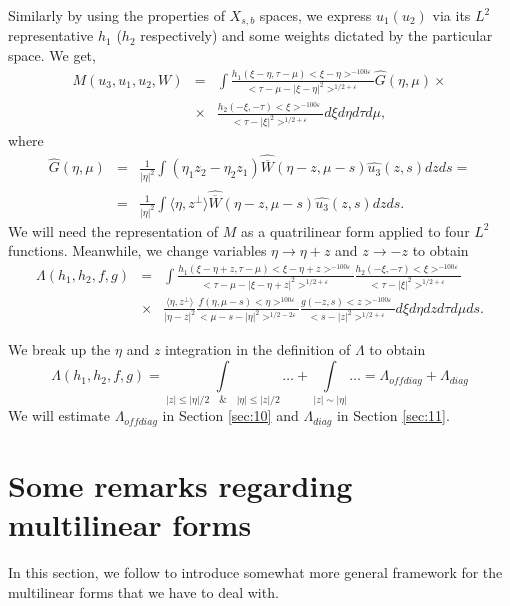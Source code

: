 \documentclass[draft,11pt,leqno]{amsart}
\newcommand{\q}{\quad}
\newcommand{\ve}{\varepsilon}
\newcommand{\La}{\Lambda}
\newcommand{\intl}{\int\limits}
\newcommand{\f}{\displaystyle\frac}
\newcommand{\dpr}[2]{\langle #1, #2\rangle}
\newcommand{\ov}{\overline}
\begin{document}
Similarly by  using  the properties of $X_{s,b}$ spaces, we express
$u_1(u_2)$ via its $L^2$ representative $h_1$ ($h_2$ respectively)
 and some weights dictated by the
particular space. We get,
\begin{eqnarray}
\label{eq:8}
M(u_3,u_1,u_2,W) &=& \int
\f{h_1(\xi-\eta,\tau-\mu)<\xi-\eta>^{-100\ve}}{<\tau-\mu-|\xi-\eta|^2>^{1/2+\ve}}
\widehat{G}(\eta,\mu) \times\\
&\times &\f{h_2(-\xi,-\tau)<\xi>^{-100\ve}}{<\tau-|\xi|^2>^{1/2+\ve}}
d\xi d\eta d\tau d\mu,
\nonumber
\end{eqnarray}
where
\begin{eqnarray}
\label{eq:9}
 \widehat{G}(\eta,\mu)  &=& \f{1}{|\eta|^2} \int (\eta_1 z_2-\eta_2 z_1)
\widehat{\ov{W}}(\eta-z,\mu-s)
\widehat{u_3}(z,s)dz ds=\\
&=& \f{1}{|\eta|^2} \int \dpr{\eta}{z^{\bot}}
\widehat{\ov{W}}(\eta-z,\mu-s)
\widehat{u_3}(z,s)dz ds.
\nonumber
\end{eqnarray}
We will need the representation
of $M$ as a quatrilinear form applied to four $L^2$ functions. Meanwhile, we
change variables $\eta\to\eta+z$ and $z\to -z$ to  obtain
\begin{eqnarray}
\label{eq:100}
\La(h_1,h_2,f,g) &=& \int
\f{h_1(\xi-\eta+z,\tau-\mu)<\xi-\eta+z>^{-100\ve}}{<\tau-\mu-|\xi-\eta+z|^2>^
{1/2+\ve}} \f{h_2(-\xi,-\tau)<\xi>^{-100\ve}}{<\tau-|\xi|^2>^{1/2+\ve}} \\
&\times & \f{\dpr{\eta}{z^{\bot}}}{|\eta-z|^2}
\f{f(\eta,\mu-s)<\eta>^{100\ve}}{<\mu-s-|\eta|^2>^{1/2-2\ve}}
\f{g(-z,s)<z>^{-100\ve}}{<s-|z|^2>^{1/2+\ve}}
d\xi d\eta dz d\tau d\mu ds.
\nonumber
\end{eqnarray}

 We break up the $\eta$ and $z$ integration in the definition of
$\La$ to obtain
$$
\La(h_1,h_2,f,g)=\intl_{|z|\leq |\eta|/2\q \&\q |\eta|\leq|z|/2 } \ldots  +
\intl_{|z|\sim |\eta|} \ldots =
\La_{off diag}+\La_{diag}
$$
We will estimate  $\La_{off diag}$ in Section \ref{sec:10}  and
$\La_{diag}$ in Section \ref{sec:11}.

\vspace{.3cm}

\section{Some remarks regarding multilinear forms}

\vspace{.3cm}

In this section, we  follow \cite{Tao} to introduce somewhat
 more general framework for
the multilinear forms that we have to deal with.
\end{document}
